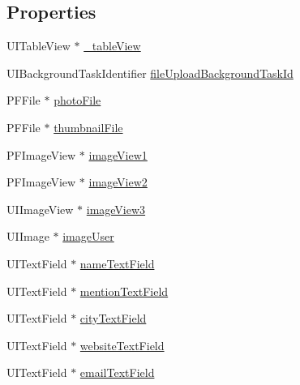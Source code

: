 \subsection*{Properties}
\begin{DoxyCompactItemize}
\item 
U\+I\+Table\+View $\ast$ \hyperlink{interface_e_s_edit_profile_view_controller_a778790ebc529f841dbc3c87ef0d28802}{\+\_\+table\+View}
\item 
U\+I\+Background\+Task\+Identifier \hyperlink{interface_e_s_edit_profile_view_controller_a4134bbf56b56be78fe28a1e7891d6414}{file\+Upload\+Background\+Task\+Id}
\item 
P\+F\+File $\ast$ \hyperlink{interface_e_s_edit_profile_view_controller_a6811ffd29191e263efa7a601fdcf7530}{photo\+File}
\item 
P\+F\+File $\ast$ \hyperlink{interface_e_s_edit_profile_view_controller_a931a49c00563f36df4c0eef6331cad48}{thumbnail\+File}
\item 
P\+F\+Image\+View $\ast$ \hyperlink{interface_e_s_edit_profile_view_controller_ab454426b9cc4c42437e9a484a7bc12b1}{image\+View1}
\item 
P\+F\+Image\+View $\ast$ \hyperlink{interface_e_s_edit_profile_view_controller_af4aa914a55612c8cd5f145175af93093}{image\+View2}
\item 
U\+I\+Image\+View $\ast$ \hyperlink{interface_e_s_edit_profile_view_controller_a052c9b7e916228749c1cdbeb7d006ac2}{image\+View3}
\item 
U\+I\+Image $\ast$ \hyperlink{interface_e_s_edit_profile_view_controller_a5ddc85314a3896fa0585c78abe79ae93}{image\+User}
\item 
U\+I\+Text\+Field $\ast$ \hyperlink{interface_e_s_edit_profile_view_controller_aadadfd57e7077ce66e81b70d2224b101}{name\+Text\+Field}
\item 
U\+I\+Text\+Field $\ast$ \hyperlink{interface_e_s_edit_profile_view_controller_a7e40d43c7b337b92e03309abc2752d9b}{mention\+Text\+Field}
\item 
U\+I\+Text\+Field $\ast$ \hyperlink{interface_e_s_edit_profile_view_controller_acf7c129a7fd548af3eed01e0023af362}{city\+Text\+Field}
\item 
U\+I\+Text\+Field $\ast$ \hyperlink{interface_e_s_edit_profile_view_controller_aa97370928b30455a6bea990788b80c75}{website\+Text\+Field}
\item 
U\+I\+Text\+Field $\ast$ \hyperlink{interface_e_s_edit_profile_view_controller_af29c5de6d2c00437c8d7eb6de1dc39a6}{email\+Text\+Field}
\item 

\end{DoxyCompactItemize}
